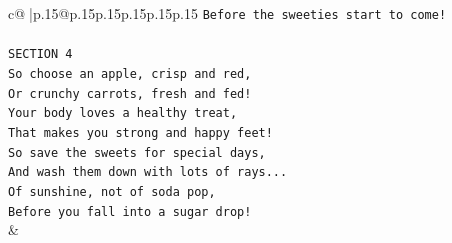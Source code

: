 \documentclass{article}
\begin{document}
{\begin{supertabular}{c@{$\;$}|p{.15\linewidth}@{}p{.15\linewidth}p{.15\linewidth}p{.15\linewidth}p{.15\linewidth}p{.15\linewidth}}
{{{\texttt{Before the sweeties start to come!} \\
\\ 
\texttt{SECTION 4} \\
\texttt{So choose an apple, crisp and red,} \\
\texttt{Or crunchy carrots, fresh and fed!} \\
\texttt{Your body loves a healthy treat,} \\
\texttt{That makes you strong and happy feet!} \\
\texttt{So save the sweets for special days,} \\
\texttt{And wash them down with lots of rays...} \\
\texttt{Of sunshine, not of soda pop,} \\
\texttt{Before you fall into a sugar drop!} \\
            }
        }
    }
    & \\ \\


\end{supertabular}}
\end{document}

